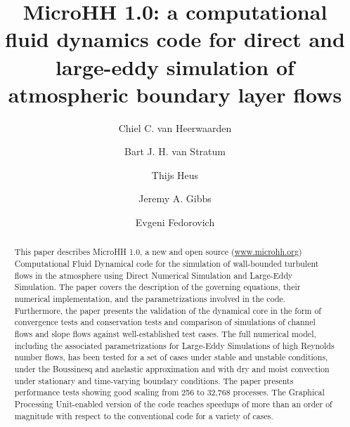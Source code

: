 \documentclass[gmd]{copernicus}
\begin{document}
\linenumbers
\raggedbottom

\title{MicroHH 1.0: a computational fluid dynamics code for direct and large-eddy simulation of atmospheric boundary layer flows}


\author[1,2]{Chiel C. van Heerwaarden}
\author[1,2]{Bart J. H. van Stratum}
\author[3]{Thijs Heus}
\author[4]{Jeremy A. Gibbs}
\author[4]{Evgeni Fedorovich}










\received{}
\pubdiscuss{} %
\revised{}
\accepted{}
\published{}




\maketitle  %

\begin{abstract}
This paper describes MicroHH 1.0, a new and open source (\url{www.microhh.org}) Computational Fluid Dynamical code for the simulation of wall-bounded turbulent flows in the atmosphere using Direct Numerical Simulation and Large-Eddy Simulation. The paper covers the description of the governing equations, their numerical implementation, and the parametrizations involved in the code. Furthermore, the paper presents the validation of the dynamical core in the form of convergence tests and conservation tests and comparison of simulations of channel flows and slope flows against well-established test cases. The full numerical model, including the associated parametrizations for Large-Eddy Simulations of high Reynolds number flows, has been tested for a set of cases under stable and unstable conditions, under the Boussinesq and anelastic approximation and with dry and moist convection under stationary and time-varying boundary conditions. The paper presents performance tests showing good scaling from 256 to 32,768 processes. The Graphical Processing Unit-enabled version of the code reaches speedups of more than an order of magnitude with respect to the conventional code for a variety of cases.
\end{abstract}
\end{document}
